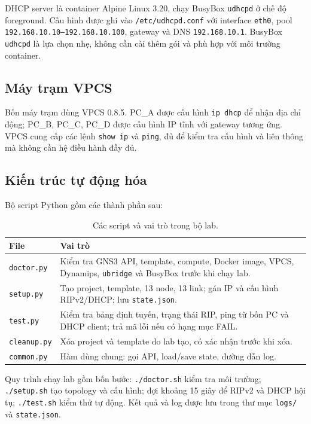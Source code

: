 \documentclass[12pt,a4paper]{article}
\begin{document}
DHCP server là container Alpine Linux 3.20, chạy BusyBox \texttt{udhcpd} ở chế độ foreground.
Cấu hình được ghi vào \texttt{/etc/udhcpd.conf} với interface \texttt{eth0}, pool
\texttt{192.168.10.10--192.168.10.100}, gateway và DNS \texttt{192.168.10.1}. BusyBox
\texttt{udhcpd} là lựa chọn nhẹ, không cần cài thêm gói và phù hợp với môi trường container.

\subsection{Máy trạm VPCS}

Bốn máy trạm dùng VPCS 0.8.5. PC\_A được cấu hình \texttt{ip dhcp} để nhận địa chỉ động; PC\_B,
PC\_C, PC\_D được cấu hình IP tĩnh với gateway tương ứng. VPCS cung cấp các lệnh \texttt{show ip}
và \texttt{ping}, đủ để kiểm tra cấu hình và liên thông mà không cần hệ điều hành đầy đủ.

\subsection{Kiến trúc tự động hóa}

Bộ script Python gồm các thành phần sau:

\begin{table}[H]
  \centering
  \caption{Các script và vai trò trong bộ lab.}
  \label{tab:scripts}
  \begin{tabularx}{\textwidth}{@{}l X@{}}
    \toprule
    \textbf{File} & \textbf{Vai trò} \\
    \midrule
    \texttt{doctor.py} & Kiểm tra GNS3 API, template, compute, Docker image, VPCS, Dynamips,
      \texttt{ubridge} và BusyBox trước khi chạy lab. \\
    \texttt{setup.py} & Tạo project, template, 13 node, 13 link; gán IP và cấu hình RIPv2/DHCP;
      lưu \texttt{state.json}. \\
    \texttt{test.py} & Kiểm tra bảng định tuyến, trạng thái RIP, ping từ bốn PC và DHCP client;
      trả mã lỗi nếu có hạng mục FAIL. \\
    \texttt{cleanup.py} & Xóa project và template do lab tạo, có xác nhận trước khi xóa. \\
    \texttt{common.py} & Hàm dùng chung: gọi API, load/save state, đường dẫn log. \\
    \bottomrule
  \end{tabularx}
\end{table}

Quy trình chạy lab gồm bốn bước: \texttt{./doctor.sh} kiểm tra môi trường; \texttt{./setup.sh}
tạo topology và cấu hình; đợi khoảng 15 giây để RIPv2 và DHCP hội tụ; \texttt{./test.sh} kiểm thử
tự động. Kết quả và log được lưu trong thư mục \texttt{logs/} và \texttt{state.json}.
\end{document}
